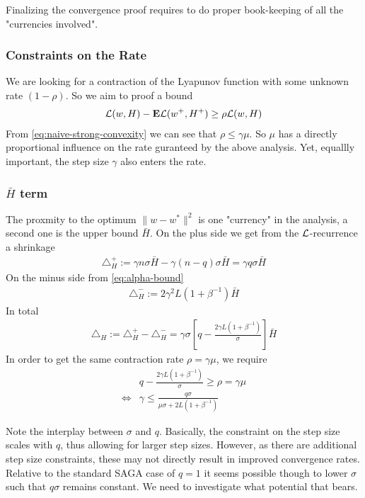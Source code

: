 \documentclass{article}
\newcommand{\E}{{\bf E}}
\begin{document}
Finalizing the convergence proof requires to do proper book-keeping of all the "currencies involved". 

\subsubsection{Constraints on the Rate}

We are looking for a contraction of the Lyapunov function with some unknown rate $(1-\rho)$.  So we aim to proof a bound  
\begin{align}
\L(w,H) - \E\L(w^+,H^+) \ge \rho \L(w,H)
\end{align}
From \eqref{eq:naive-strong-convexity} we can see that $\rho \leq \gamma \mu$.  So $\mu$ has a directly proportional influence on the rate guranteed by the above analysis. Yet, equallly important, the step size $\gamma$ also enters the rate. 

\subsubsection{$\bar H$ term} 

The proxmity to the optimum $\| w- w^*\|^2$ is one "currency" in the analysis, a second one is the upper bound $\bar H$.  On the plus side we get from the ${\mathcal L}$-recurrence a shrinkage 
\begin{align}
\triangle^+_H := \gamma n \sigma  \bar H - \gamma  (n-q) \sigma  \bar H 
= \gamma q \sigma \bar H
\end{align}
On the minus side from \eqref{eq:alpha-bound}
\begin{align}
\triangle^-_H :=   2 \gamma^2 L (1 + \beta^{-1}) \bar H 
\end{align}
In total 
\begin{align}
\triangle_H := \triangle_H^+ - \triangle_H^- = \gamma \sigma 
\left[  q- \frac{2\gamma L \left(1 + \beta^{-1} \right)}{\sigma} \right] \bar H 
\end{align}
%
In order to get the same contraction rate $\rho = \gamma \mu$, we require
\begin{align}
& q  - \frac{2 \gamma L \left(1 + \beta^{-1} \right)}{\sigma} \ge \rho = \gamma \mu \\
\iff & \gamma \le \frac {q \sigma} {\mu \sigma +  2L \left(1 + \beta^{-1} \right)} 
\label{eq:step-bound-from-h}
\end{align}

Note the interplay between $\sigma$ and $q$. Basically, the constraint on the step size scales with $q$, thus allowing for larger step sizes. However, as there are additional step size constraints, these may not directly result in improved convergence rates. Relative to the standard SAGA case of $q=1$ it seems possible though to lower $\sigma$ such that $q \sigma$  remains constant. We need to investigate what potential that bears. 
\end{document}
